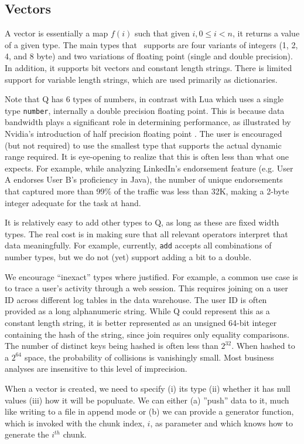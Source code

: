 \subsection{Vectors}
\label{Vectors}
A vector is essentially a map \(f(i)\) such that given \(i, 0 \leq i < n\), it
returns a value of a given type. The main types that \Q\ supports are four variants
of integers (1, 2, 4, and 8 byte) and two variations of floating point (single
and double precision). In addition, it supports bit vectors and constant length
strings. There is limited support for variable length strings, which are used
primarily as dictionaries. 

Note that Q has 6 types of numbers, in contrast with Lua which uses a 
single type {\tt number}, internally a double precision floating point.
This is because data bandwidth plays a significant role in determining
performance, as illustrated by Nvidia's
introduction of half precision floating point  \cite{nvidia2017}. The user is
encouraged (but not required) to use the smallest type that supports the actual
dynamic range required. It is eye-opening to realize that this is often  less
than what one expects. For example, while analyzing LinkedIn's endorsement feature
(e.g. User A endorses User B's proficiency in Java),
the number of unique endorsements that captured more than 99\% of the traffic
was less than 32K, making a 2-byte integer adequate for the task at hand.

It is relatively easy to add other types to Q, as long as these 
are fixed width types. The real cost is in making sure that all relevant
operators interpret that data meaningfully. For example, currently, {\tt add}
accepts all combinations of number types, but we do not (yet)
support adding a bit to a double.

We
encourage ``inexact'' types where justified. For example, a common use case is
to trace a user's activity through a web session. This requires joining on a
user ID across different log tables in the data warehouse. The user ID is
often provided as a long alphanumeric string. While Q could represent this as a
constant length string, it is better represented as an unsigned 64-bit integer
containing the hash of the string, since join requires only equality comparisons.
The number of distinct keys being hashed is often less than \(2^{32}\). When
hashed to a \(2^{64}\) space, the probability of collisions is vanishingly
small. Most business analyses are insensitive to this level of imprecision.

When a vector is created, we need to specify (i) its type (ii) whether it has
null values (iii) how it will be populuate. We can either (a) ''push'' data to
it, much like writing to a file in append mode or (b) we can provide a generator function,
which is invoked with the chunk index, \(i\), as parameter and which knows how to
generate the \(i^{th}\) chunk.

